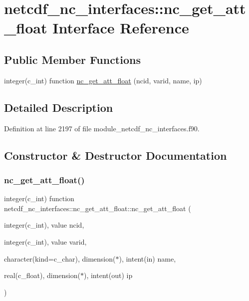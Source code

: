 \hypertarget{interfacenetcdf__nc__interfaces_1_1nc__get__att__float}{}\section{netcdf\+\_\+nc\+\_\+interfaces\+:\+:nc\+\_\+get\+\_\+att\+\_\+float Interface Reference}
\label{interfacenetcdf__nc__interfaces_1_1nc__get__att__float}
\subsection*{Public Member Functions}
\begin{DoxyCompactItemize}
\item 
integer(c\+\_\+int) function \hyperlink{interfacenetcdf__nc__interfaces_1_1nc__get__att__float_a3ea1a4d2a3e0257a6ecd3e31ccc1a6e1}{nc\+\_\+get\+\_\+att\+\_\+float} (ncid, varid, name, ip)
\end{DoxyCompactItemize}


\subsection{Detailed Description}


Definition at line 2197 of file module\+\_\+netcdf\+\_\+nc\+\_\+interfaces.\+f90.



\subsection{Constructor \& Destructor Documentation}
\mbox{\label{interfacenetcdf__nc__interfaces_1_1nc__get__att__float_a3ea1a4d2a3e0257a6ecd3e31ccc1a6e1}} 
\subsubsection{\texorpdfstring{nc\+\_\+get\+\_\+att\+\_\+float()}{nc\_get\_att\_float()}}
{\footnotesize\ttfamily integer(c\+\_\+int) function netcdf\+\_\+nc\+\_\+interfaces\+::nc\+\_\+get\+\_\+att\+\_\+float\+::nc\+\_\+get\+\_\+att\+\_\+float (\begin{DoxyParamCaption}\item[{integer(c\+\_\+int), value}]{ncid,  }\item[{integer(c\+\_\+int), value}]{varid,  }\item[{character(kind=c\+\_\+char), dimension($\ast$), intent(in)}]{name,  }\item[{real(c\+\_\+float), dimension($\ast$), intent(out)}]{ip }\end{DoxyParamCaption})}



